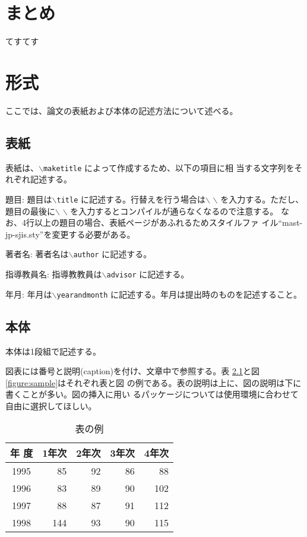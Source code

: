 \documentclass[a4paper,11pt]{jreport}
\begin{document}
\chapter{まとめ}

てすてす

\chapter{形式}

ここでは、論文の表紙および本体の記述方法について述べる。

\section{表紙}

表紙は、{\tt $\backslash$maketitle} によって作成するため、以下の項目に相
当する文字列をそれぞれ記述する。

\begin{description} \parskip=1pt
\item{題目: }
題目は{\tt $\backslash$title} に記述する。行替えを行う場合は$\backslash$
	   $\backslash$ を入力する。ただし、題目の最後に$\backslash$
	   $\backslash$ を入力するとコンパイルが通らなくなるので注意する。
	   なお、4行以上の題目の場合、表紙ページがあふれるためスタイルファ
	   イル``mast-jp-sjis.sty''を変更する必要がある。
\item{著者名: }
著者名は{\tt $\backslash$author} に記述する。
\item{指導教員名: }
指導教教員は{\tt $\backslash$advisor} に記述する。
\item{年月: }
年月は{\tt $\backslash$yearandmonth} に記述する。年月は提出時のものを記述すること。
\end{description}

\section{本体}

本体は1段組で記述する。

図表には番号と説明(caption)を付け、文章中で参照する。表
\ref{table:fundamental_data_type}と図\ref{figure:sample}はそれぞれ表と図
の例である。表の説明は上に、図の説明は下に書くことが多い。図の挿入に用い
るパッケージについては使用環境に合わせて自由に選択してほしい。

\begin{table}[hbt]
\caption{表の例}
\label{table:fundamental_data_type}
\begin{center}
\begin{tabular}{| c | r | r | r | r |}
\hline
年 度 & 1年次 & 2年次 & 3年次 & 4年次 \\
\hline
1995 & 85 & 92 & 86 & 88 \\
1996 & 83 & 89 & 90 & 102 \\
1997 & 88 & 87 & 91 & 112 \\
1998 & 144 & 93 & 90 & 115 \\
\hline 
\end{tabular}
\end{center}
\end{table}
\medskip
\end{document}
